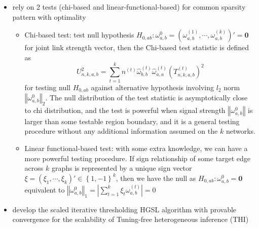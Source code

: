\documentclass[twoside]{article}
\begin{document}
\begin{itemize}
\begin{itemize}
\begin{itemize}
        \end{itemize}
    \end{itemize}
    \item rely on 2 tests (chi-based and linear-functional-based) for common sparsity pattern with optimality 
    \begin{itemize}
        \item Chi-based test: test null hypothesis $H_{0,ab}:\omega_{a,b}^0 = \left(\omega_{a,b}^{(1)},\cdots,\omega_{a,b}^{(k)}\right)' =\mathbf{0}$ for joint link strength vector, then the Chi-based test statistic is defined as $$ U_{n,k,a,b}^2 = \sum^k_{t=1}n^{(t)}\hat{\omega}_{b,b}^{(t)}\hat{\omega}_{a,a}^{(t)}\left( T^{(t)}_{n,k,a,b} \right)^2 $$ for testing null $H_{0,ab}$ against alternative hypothesis involving $l_2$ norm $\left\Vert \omega^0_{a,b} \right\Vert _2$. The null distribution of the test statistic is asymptotically close to chi distribution, and the test is powerful when signal strength $\left\Vert \omega^0_{a,b} \right\Vert$ is larger than some testable region boundary, and it is a general testing procedure without any additional information assumed on the $k$ networks.
        \item Linear functional-based test: with some extra knowledge, we can have a more powerful testing procedure. If sign relationship of some target edge across $k$ graphs is represented by a unique sign vector $\xi =\left( \xi_1,\cdots,\xi_k \right)'\in\left\{1,-1\right\}^k$, then we have the null as $H_{0,ab}:\omega^0_{a,b}=\mathbf{0}$ equivalent to $\left\Vert \omega^0_{a,b} \right\Vert _1 = \left\vert \sum^k_{t=1}\xi_t \omega^{(t)}_{a,b} \right\vert = 0$
    \end{itemize}
    \item develop the scaled iterative thresholding HGSL algorithm with provable convergence for the scalability of Tuning-free heterogeneous inference (THI)
\end{itemize}


\newpage


\end{document}
